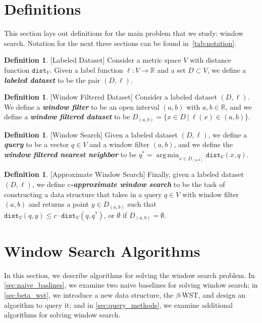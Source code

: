 \documentclass{article}
\theoremstyle{plain}
\theoremstyle{definition}
\newtheorem{definition}[theorem]{Definition}
\theoremstyle{remark}
\DeclareMathOperator*{\argmin}{arg\,min}
\newcommand{\shangdi}[1]{{\color{blue}{\bf Shangdi:} #1}}
\newcommand{\josh}[1]{{\color{orange}{\bf Josh:} #1}}
\newcommand{\emp}[1]{{\textbf{\textit{#1}}}}
\begin{document}
\section{Definitions}

This section lays out definitions for the main problem that we study: window search. Notation for the next three sections can be found in~\cref{tab:notation}.

\begin{definition}
\label{def:labeled-dataset}[Labeled Dataset]
Consider a metric space $V$ with distance function $\texttt{dist}_V$. Given a label function $\ell: V \rightarrow \mathbb{R}$ and a set $D \subset V$, we define a \emp{labeled dataset} to be the pair $(D, \ell)$.
\end{definition}

\begin{definition}
\label{def:filtered_dataset}[Window Filtered Dataset]
Consider a labeled dataset $(D, \ell)$. We define a \emp{window filter} to be an open interval $( a, b)$ with $a, b \in \mathbb{R}$, and we define a \emp{window filtered dataset} to be $D_{(a, b)} = \{x \in D\ |\ \ell(x) \in (a, b)\}$.
\end{definition}

\begin{definition}
\label{def:problem}[Window Search]
Given a labeled dataset $(D, \ell)$, we define a \emp{query} to be a vector $q \in V$ and a window filter $(a, b)$, and we define the \emp{window filtered nearest neighbor} to be
$q^* = \argmin_{x \in D_{(a, b)}} \texttt{dist}_V(x, q)$.
\end{definition}

\begin{definition}\label{def:aws}[Approximate Window Search]
Finally, given a labeled dataset $(D, \ell)$, we define \emp{$c$-approximate window search} to be the task of constructing a data structure that takes in a query $q \in V$ with window filter $(a, b)$ and returns a point $y \in D_{(a, b)}$ such that
$\texttt{dist}_V(q, y) \le c \cdot \texttt{dist}_V(q, q^*)$,
or $\emptyset$ if $D_{(a, b)} = \emptyset$.
\end{definition}


\section{Window Search Algorithms}
In this section, we describe algorithms for solving the window search problem. In \cref{sec:naive_baslines}, we examine two naive baselines for solving window search; in \cref{sec:beta_wst}, we introduce a new data structure, the $\beta$-WST, and design an algorithm to query it; and in \cref{sec:query_methods}, we examine additional algorithms for solving window search. 
\end{document}
